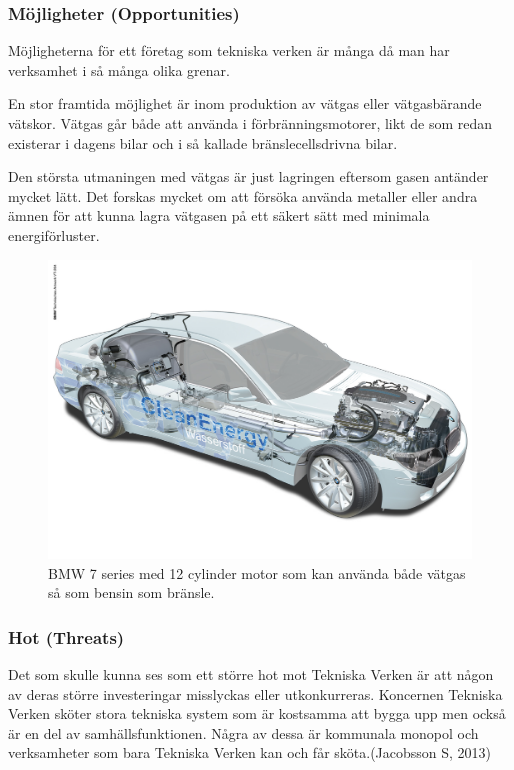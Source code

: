 \documentclass[10pt,a4paper]{article}
\begin{document}
\subsubsection{Möjligheter (Opportunities)}
Möjligheterna för ett företag som tekniska verken är många då man har verksamhet i så många olika grenar. 

En stor framtida möjlighet är inom produktion av vätgas eller vätgasbärande vätskor. Vätgas går både att använda i förbränningsmotorer, likt de som redan existerar i dagens bilar och i så kallade bränslecellsdrivna bilar. 

Den största utmaningen med vätgas är just lagringen eftersom gasen antänder mycket lätt. Det forskas mycket om att försöka använda metaller eller andra ämnen för att kunna lagra vätgasen på ett säkert sätt med minimala energiförluster.

\begin{figure}[H] 
\centerline{\includegraphics[scale=0.14]{Bilder/bmwcar.jpg}}
\caption{BMW 7 series med 12 cylinder motor som kan använda både vätgas så som bensin som bränsle.}
\label{fig:bmw}
\end{figure}



\subsubsection{Hot (Threats)}
Det som skulle kunna ses som ett större hot mot Tekniska Verken är
att någon av deras större investeringar misslyckas eller
utkonkurreras. Koncernen Tekniska Verken sköter stora tekniska system som är
kostsamma att bygga upp men också är en del av
samhällsfunktionen. Några av dessa är kommunala monopol och
verksamheter som bara Tekniska Verken kan och får sköta.(Jacobsson S, 2013) 
\end{document}
